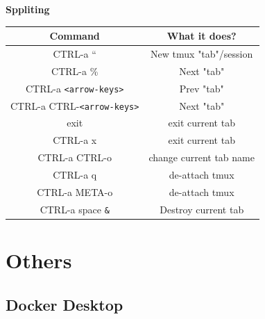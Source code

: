 \documentclass{article}
\begin{document}
\textbf{Sppliting}
\begin{table}[H]
\begin{tabular}{| c  |c  |}
\hline
\textbf{Command} & \textbf{What it does?} \\ \hline
CTRL-a “ & New tmux "tab"/session \\
CTRL-a \% & Next "tab" \\
CTRL-a \verb|<arrow-keys>| & Prev "tab" \\
CTRL-a CTRL-\verb|<arrow-keys>| & Next "tab" \\
exit & exit current tab \\
CTRL-a x & exit current tab \\
CTRL-a CTRL-o & change current tab name \\
CTRL-a q & de-attach tmux \\
CTRL-a META-o & de-attach tmux \\
CTRL-a space \verb|&| & Destroy current tab \\
\hline
\end{tabular}
\end{table}

\newpage
\section{Others}

\subsection{Docker Desktop}
\end{document}
